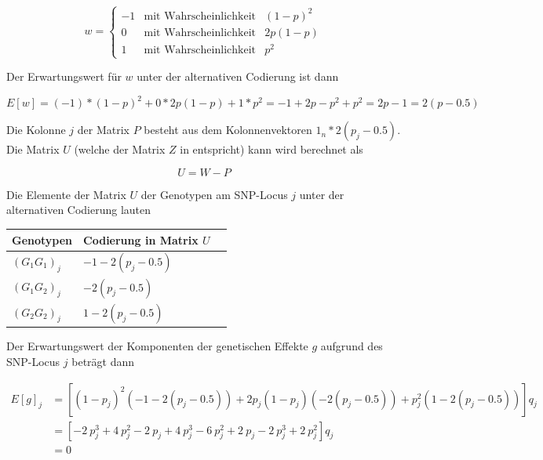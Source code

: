 \documentclass[]{book}
\begin{document}
\begin{equation}
w = \left\{ \begin{array}{lll}
-1  &  \text{mit Wahrscheinlichkeit} & (1-p)^2\\
0  &  \text{mit Wahrscheinlichkeit} & 2p(1-p) \\
1  &  \text{mit Wahrscheinlichkeit} & p^2
\end{array}
\right.
\label{eq:RandVarGenotypesWalternative}
\end{equation}

Der Erwartungswert für \(w\) unter der alternativen Codierung ist dann

\begin{equation}
E\left[w\right] = (-1)*(1-p)^2 + 0 * 2p(1-p) + 1 * p^2 = -1 + 2p - p^2 + p^2 = 2p - 1 = 2(p - 0.5)
\label{eq:ExpectedValueWalternative}
\end{equation}

Die Kolonne \(j\) der Matrix \(P\) besteht aus dem Kolonnenvektoren
\(1_n*2(p_j - 0.5)\). Die Matrix \(U\) (welche der Matrix \(Z\) in
\citep{VanRaden2008} entspricht) kann wird berechnet als

\begin{equation}
U = W - P
\label{eq:MatrixUalternative}
\end{equation}

Die Elemente der Matrix \(U\) der Genotypen am SNP-Locus \(j\) unter der
alternativen Codierung lauten

\vspace{2ex}\begin{center}
\begin{tabular}{|l|l|l|}
\hline
Genotypen     &  Codierung in Matrix $U$\\
\hline
$(G_1G_1)_j$  &  $-1-2(p_j-0.5)$\\
$(G_1G_2)_j$  &  $-2(p_j-0.5)$  \\
$(G_2G_2)_j$  &  $1-2(p_j-0.5)$ \\
\hline
\end{tabular}
\end{center}

Der Erwartungswert der Komponenten der genetischen Effekte \(g\)
aufgrund des SNP-Locus \(j\) beträgt dann

\begin{equation}
\begin{split}
E\left[g\right]_j & = \left[(1-p_j)^2(-1-2(p_j-0.5)) + 2p_j(1-p_j)(-2(p_j-0.5)) + p_j^2(1-2(p_j-0.5))\right]q_j\\
  & = \left[- 2 \ p_j^{3} + 4 \ p_j^{2} - 2 \ p_j 
            + 4 \ p_j^{3} - 6 \ p_j^{2} + 2 \ p_j 
            - 2 \ p_j^{3} + 2 \  p_j^{2} \right]q_j\\
  & = 0
\end{split}
\label{eq:ExpectedValueGjalternative}
\end{equation}
\end{document}
